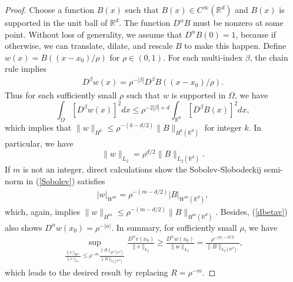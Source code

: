 \documentclass[12pt]{article}
\theoremstyle{plain}
\theoremstyle{remark}
\begin{document}
\begin{proof}
    Choose a function $B(x)$ such that $B(x)\in C^\infty(\mathbb{R}^d)$ and $B(x)$ is supported in the unit ball of $\mathbb{R}^d$. The function $D^\alpha B$ must be nonzero at some point. Without loss of generality, we assume that $D^\alpha B(0)=1$, because if otherwise, we can translate, dilate, and rescale $B$ to make this happen.
    Define $w(x)=B((x-x_0)/\rho)$ for  $\rho\in(0,1)$. For each multi-index $\beta$, the chain rule implies
    \begin{eqnarray}\label{dbetav}
        D^\beta w(x)=\rho^{-|\beta|}D^\beta B((x-x_0)/\rho).
    \end{eqnarray}
    Thus for each sufficiently small $\rho$ such that $w$ is supported in $\Omega$, we have
    \[\int_\Omega [D^\beta w (x)]^2dx\leq \rho^{-2|\beta|+d}\int_{\mathbb{R}^d} [D^\beta B(x)]^2dx,\]
    which implies that $\|w\|_{H^k}\leq \rho^{-(k-d/2)}\|B\|_{H^k(\mathbb{R}^d)}$ for integer $k$. In particular, we have 
    \[\|w\|_{L_2}=\rho^{d/2}\|B\|_{L_2(\mathbb{R}^d)}.\]
    If $m$ is not an integer, direct calculations show the Sobolev-Slobodeckij semi-norm in (\ref{Sobolev}) satisfies
    \begin{eqnarray*}
        |w|_{W^m}=\rho^{-(m-d/2)}|B|_{W^m(\mathbb{R}^d)},
    \end{eqnarray*}
    which, again, implies $\|w\|_{H^m}\leq \rho^{-(m-d/2)}\|B\|_{H^m(\mathbb{R}^d)}$. Besides, (\ref{dbetav}) also shows $D^\alpha w(x_0)=\rho^{-|\alpha|}$. In summary, for sufficiently small $\rho$, we have
    \begin{eqnarray*}
        \sup_{\frac{\|v\|_{H^m}}{\|v\|_{L_2}}\leq\rho^{-m}\frac{\|B\|_{H^m(\mathbb{R}^d)}}{\|B\|_{L_2(\mathbb{R}^d)}}}\frac{D^\alpha v(x_0)}{\|v\|_{L_2}}\geq \frac{D^\alpha w(x_0)}{\|w\|_{L_2}}=\frac{\rho^{-|\alpha|-d/2}}{\|B\|_{L_2(\mathbb{R}^d)}},
    \end{eqnarray*}
    which leads to the desired result by replacing $R=\rho^{-m}$.    
\end{proof}
\end{document}
